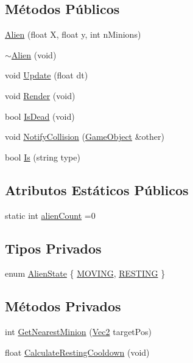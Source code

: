 \subsection*{Métodos Públicos}
\begin{DoxyCompactItemize}
\item 
\hyperlink{classAlien_ac5669bcecd6fb077cb7e6450a72105f4}{Alien} (float X, float y, int n\+Minions)
\item 
\hyperlink{classAlien_a2db6b66f06d32b6c8c689255e35e2f92}{$\sim$\+Alien} (void)
\item 
void \hyperlink{classAlien_a5bcca286b1a9d8f3fc56a2e8d5636b19}{Update} (float dt)
\item 
void \hyperlink{classAlien_a43e7b457eb4f8c41deae1a37aaf8622c}{Render} (void)
\item 
bool \hyperlink{classAlien_a27d2042c7097c2d37bb0268575ec8bad}{Is\+Dead} (void)
\item 
void \hyperlink{classAlien_a47baef9f1b44ad393b268812b752bd3a}{Notify\+Collision} (\hyperlink{classGameObject}{Game\+Object} \&other)
\item 
bool \hyperlink{classAlien_a9697e1dc132cc829d787c8bd586a01a2}{Is} (string type)
\end{DoxyCompactItemize}
\subsection*{Atributos Estáticos Públicos}
\begin{DoxyCompactItemize}
\item 
static int \hyperlink{classAlien_abde06bf01bdb2d9786b7815d0db5d17d}{alien\+Count} =0
\end{DoxyCompactItemize}
\subsection*{Tipos Privados}
\begin{DoxyCompactItemize}
\item 
enum \hyperlink{classAlien_ae23fef43ed399f4b117ccf0520173455}{Alien\+State} \{ \hyperlink{classAlien_ae23fef43ed399f4b117ccf0520173455afbdbebbbfd9cfe581a6934b67727c99b}{M\+O\+V\+I\+N\+G}, 
\hyperlink{classAlien_ae23fef43ed399f4b117ccf0520173455a2a5c16b3119d8a7466ca285159173710}{R\+E\+S\+T\+I\+N\+G}
 \}
\end{DoxyCompactItemize}
\subsection*{Métodos Privados}
\begin{DoxyCompactItemize}
\item 
int \hyperlink{classAlien_a1364c1ebddf1cebfdcee250a2b1f82f9}{Get\+Nearest\+Minion} (\hyperlink{classVec2}{Vec2} target\+Pos)
\item 
float \hyperlink{classAlien_a39926c487410c1604b7d4f330ead6adf}{Calculate\+Resting\+Cooldown} (void)
\end{DoxyCompactItemize}
